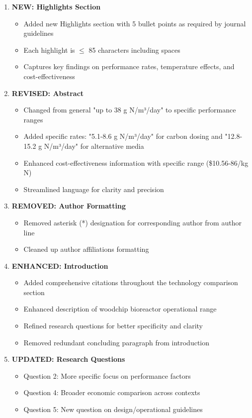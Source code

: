 \documentclass[12pt,a4paper]{article}
\begin{document}
\begin{enumerate}
\item \textbf{\textcolor{addedtext}{NEW: Highlights Section}}
   \begin{itemize}
   \item Added new Highlights section with 5 bullet points as required by journal guidelines
   \item Each highlight is $\leq$ 85 characters including spaces
   \item Captures key findings on performance rates, temperature effects, and cost-effectiveness
   \end{itemize}

\item \textbf{\textcolor{changedtext}{REVISED: Abstract}}
   \begin{itemize}
   \item Changed from general "up to 38 g N/m³/day" to specific performance ranges
   \item Added specific rates: "5.1-8.6 g N/m³/day" for carbon dosing and "12.8-15.2 g N/m³/day" for alternative media
   \item Enhanced cost-effectiveness information with specific range (\$10.56-86/kg N)
   \item Streamlined language for clarity and precision
   \end{itemize}

\item \textbf{\textcolor{deletedtext}{REMOVED: Author Formatting}}
   \begin{itemize}
   \item Removed asterisk (*) designation for corresponding author from author line
   \item Cleaned up author affiliations formatting
   \end{itemize}

\item \textbf{\textcolor{changedtext}{ENHANCED: Introduction}}
   \begin{itemize}
   \item Added comprehensive citations throughout the technology comparison section
   \item Enhanced description of woodchip bioreactor operational range
   \item Refined research questions for better specificity and clarity
   \item Removed redundant concluding paragraph from introduction
   \end{itemize}

\item \textbf{\textcolor{changedtext}{UPDATED: Research Questions}}
   \begin{itemize}
   \item Question 2: More specific focus on performance factors
   \item Question 4: Broader economic comparison across contexts
   \item Question 5: New question on design/operational guidelines
   \end{itemize}
\end{enumerate}
\end{document}
